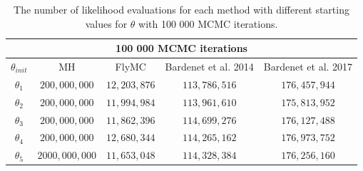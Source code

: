  \begin{table}[ht]
    \centering
\begin{tabular}{|c|c|c|c|c|}
  \hline
    \multicolumn{5}{|c|}{100 000 MCMC iterations} \\
    \hline
\hline
        $\theta_{init}$ &  MH & FlyMC & Bardenet et al. 2014 & Bardenet et al. 2017\\ 
         \hline \hline$\theta_1$ & $200,000,000$ & $12,203,876$ & $113,786,516$ & $176,457,944$ \\
        $\theta_2$ & $200,000,000$ & $11,994,984$ & $113,961,610$ & $175,813,952$ \\
        $ \theta_3$ & $200,000,000$ & $11,862,396$ & $114,699,276$ & $176,127,488$ \\
        $\theta_4$ & $200,000,000$ & $12,680,344$ & $114,265,162$ & $176,973,752$ \\
        $\theta_5$ &$2000,000,000$&$11,653,048$&$114,328,384$&$176,256,160$
        \\ \hline
\end{tabular}
\caption{The number of likelihood evaluations for each method with different starting values for $\theta$ with 100 000 MCMC iterations.}
\label{tab:ll_evals_100k_normal}
\end{table} 
